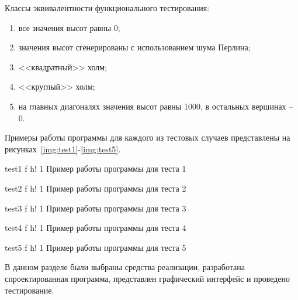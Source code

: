 Классы эквивалентности функционального тестирования:

\begin{enumerate}
	\item все значения высот равны 0;
	\item значения высот сгенерированы с использованием шума Перлина;
	\item <<квадратный>> холм;
	\item <<круглый>> холм;
	\item на главных диагоналях значения высот равны 1000, в остальных вершинах -- 0.
\end{enumerate}

Примеры работы программы для каждого из тестовых случаев представлены на рисунках~\ref{img:test1}-\ref{img:test5}.

\FloatBarrier
{}
{test1} %
{f} %
{h!} %
{1\textwidth} %
{Пример работы программы для теста 1} %
\FloatBarrier

\FloatBarrier
{}
{test2} %
{f} %
{h!} %
{1\textwidth} %
{Пример работы программы для теста 2} %
\FloatBarrier

\FloatBarrier
{}
{test3} %
{f} %
{h!} %
{1\textwidth} %
{Пример работы программы для теста 3} %
\FloatBarrier

\FloatBarrier
{}
{test4} %
{f} %
{h!} %
{1\textwidth} %
{Пример работы программы для теста 4} %
\FloatBarrier

\FloatBarrier
{}
{test5} %
{f} %
{h!} %
{1\textwidth} %
{Пример работы программы для теста 5} %
\FloatBarrier


В данном разделе были выбраны средства реализации, разработана спроектированная программа, представлен графический интерфейс и проведено тестирование.